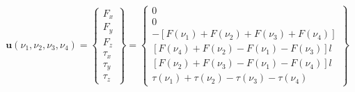 \begin{equation}\label{eq:SistemaQuadrirotore_vettorecomando}
	\mathbf{u}(\nu_1,\nu_2,\nu_3,\nu_4) = 
	\begin{Bmatrix}
		F_x \\ F_y \\ F_z \\ \tau_x \\ \tau_y \\ \tau_z
	\end{Bmatrix}
	=\begin{Bmatrix}
		0 \\ 0 \\
		-\left[F(\nu_1)+F(\nu_2)+F(\nu_3)+F(\nu_4)\right] \\
		\left[F(\nu_4)+F(\nu_2)-F(\nu_1)-F(\nu_3)\right ] l \\
		\left[F(\nu_2)+F(\nu_3)-F(\nu_1)-F(\nu_4)\right] l \\
		\tau(\nu_1)+\tau(\nu_2)-\tau(\nu_3)-\tau(\nu_4)
	\end{Bmatrix}
\end{equation} 


